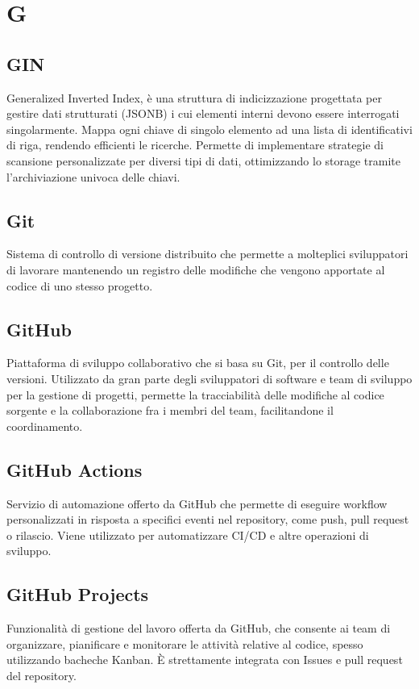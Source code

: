 \documentclass[10pt, letterpaper]{article}
\begin{document}
\section{G}

\subsection*{GIN}
Generalized Inverted Index, è una struttura di indicizzazione progettata per gestire dati strutturati (JSONB) i cui elementi interni devono essere interrogati singolarmente. Mappa ogni chiave di singolo elemento ad una lista di identificativi di riga, rendendo efficienti le ricerche. Permette di implementare strategie di scansione personalizzate per diversi tipi di dati, ottimizzando lo storage tramite l'archiviazione univoca delle chiavi.

\subsection*{Git}
Sistema di controllo di versione distribuito che permette a molteplici sviluppatori di lavorare mantenendo un registro delle modifiche che vengono apportate al
codice di uno stesso progetto.

\subsection*{GitHub}
Piattaforma di sviluppo collaborativo che si basa su Git, per il controllo delle versioni. Utilizzato da gran parte degli sviluppatori di software e team di
sviluppo per la gestione di progetti, permette la tracciabilità delle modifiche al codice sorgente e la collaborazione fra i membri del team, facilitandone
il coordinamento.

\subsection*{GitHub Actions}
Servizio di automazione offerto da GitHub che permette di eseguire workflow personalizzati
in risposta a specifici eventi nel repository, come push, pull request o rilascio. Viene utilizzato per automatizzare CI/CD e altre operazioni di sviluppo.

\subsection*{GitHub Projects}
Funzionalità di gestione del lavoro offerta da GitHub, che consente ai team di organizzare, pianificare e monitorare le attività relative al codice, spesso
utilizzando bacheche Kanban. È strettamente integrata con Issues e pull request del repository.
\end{document}
